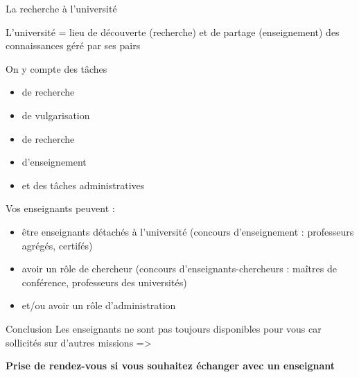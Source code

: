 \documentclass [xcolor=x11names,t] {beamer}
\begin{document}
\begin{frame}{La recherche à l'université}
   
    \begin{block}{L’université = lieu de découverte (recherche) et de partage (enseignement) des connaissances géré par ses pairs}

\begin{minipage}{0.35\textwidth}
        On y compte des tâches 
        \begin{itemize}
            \item de recherche
            \item de vulgarisation
            \item de recherche
            \item  d’enseignement
            \item  et des tâches administratives
        \end{itemize}
\end{minipage}\hfill
\begin{minipage}{0.61\textwidth}
Vos enseignants peuvent :
\begin{itemize}
    \item être enseignants détachés à l’université (concours d’enseignement : professeurs agrégés, certifés)
    \item avoir un rôle de chercheur (concours d’enseignants-chercheurs : maîtres de conférence, professeurs des universités)
    \item et/ou avoir un rôle d’administration
\end{itemize}

\end{minipage}

    \end{block}
\begin{alertblock}{Conclusion}
Les enseignants ne sont pas toujours disponibles pour vous car sollicités sur d’autres missions 
=> 

\textbf{Prise de rendez-vous si vous souhaitez échanger avec un enseignant}
    
\end{alertblock}
    
\end{frame}
\end{document}

